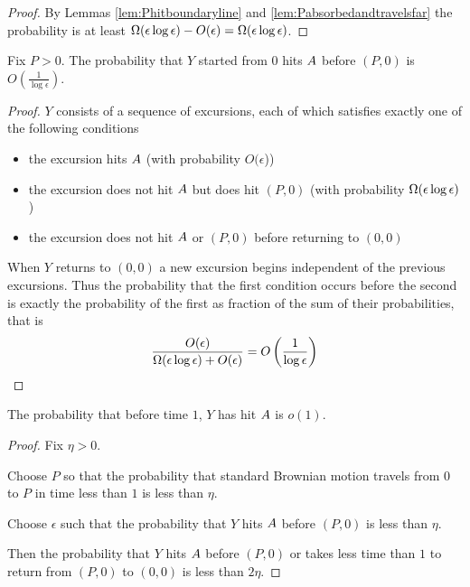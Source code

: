 {\begin{proof}
  By Lemmas \ref{lem:Phitboundaryline} and
  \ref{lem:Pabsorbedandtravelsfar} the probability is at least
  $\Omega(\epsilon\log\epsilon) - O(\epsilon) = \Omega(\epsilon\log\epsilon)$.
\end{proof}

\begin{lemma}
  Fix $P > 0$.  The probability that $Y$ started from $0$ hits
  $A$ before $(P,0)$ is $O(\frac{1}{\log\epsilon})$.
\end{lemma}

\newcommand{\Oe}{O(\epsilon)}

\begin{proof}
  $Y$ consists of a sequence of excursions, each of which satisfies
  exactly one of the following conditions
  \begin{itemize}
  \item the excursion hits $A$ (with probability
    $O(\epsilon$))
  \item the excursion does not hit $A$ but does hit
    $(P,0)$ (with probability $\Omega(\epsilon\log\epsilon)$)
  \item the excursion does not hit $A$ or $(P,0)$ before
    returning to $(0,0)$
  \end{itemize}
  When $Y$ returns to $(0,0)$ a new excursion begins independent of
  the previous excursions.  Thus the probability that the first
  condition occurs before the second is exactly the probability of the
  first as fraction of the sum of their probabilities, that is
  \[
  \frac{\Oe}{\Omegaeloge + \Oe} = O\left(\frac{1}{\log\epsilon}\right)
  \]
\end{proof}

\begin{lemma}
  The probability that before time $1$, $Y$ has hit $A$
  is $o(1)$.
\end{lemma}

\begin{proof}
  Fix $\eta > 0$.

  Choose $P$ so that the probability that standard Brownian motion
  travels from $0$ to $P$ in time less than $1$ is less than
  $\eta$.

  Choose $\epsilon$ such that the probability that $Y$ hits
  $A$ before $(P,0)$ is less than $\eta$.

  Then the probability that $Y$ hits $A$ before $(P,0)$
  or takes less time than $1$ to return from $(P,0)$ to $(0,0)$ is
  less than $2\eta$.
\end{proof}

}
